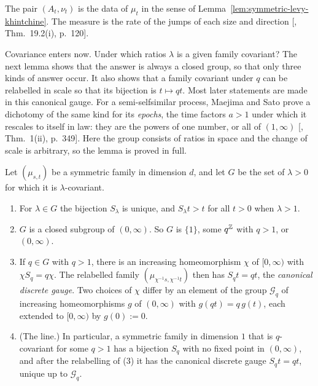 The pair $(A_t, \nu_t)$ is the \Levy{} data of $\mu_t$ in the sense of
Lemma~\ref{lem:symmetric-levy-khintchine}. The \Levy{} measure is the rate of the jumps of each size and
direction [, Thm.~19.2(i), p.~120].

Covariance enters now. Under which ratios $\lambda$ is a given family covariant? The next lemma
shows that the answer is always a closed group, so that only three kinds of answer occur. It also
shows that a family covariant under $q$ can be relabelled in scale so that its bijection is
$t \mapsto qt$. Most later statements are made in this canonical gauge. For a semi-selfsimilar
process, Maejima and Sato prove a dichotomy of the same kind for its \emph{epochs}, the time
factors $a > 1$ under which it rescales to itself in law: they are the powers of one number, or
all of $(1,\infty)$ [, Thm.~1(ii), p.~349]. Here the group consists of
ratios in space and the change of scale is arbitrary, so the lemma is proved in full.

\begin{lemma}
\label{lem:family-dilations}

Let $(\mu_{s,t})$ be a symmetric family in dimension $d$, and let $G$ be the set of $\lambda > 0$ for
which it is $\lambda$-covariant.
\begin{enumerate}
\item For $\lambda \in G$ the bijection $S_\lambda$ is unique, and $S_\lambda t > t$ for all $t > 0$
when $\lambda > 1$.
\item $G$ is a closed subgroup of $(0,\infty)$. So $G$ is $\{1\}$, some $q^{\mathbb{Z}}$ with $q > 1$, or
$(0,\infty)$.
\item If $q \in G$ with $q > 1$, there is an increasing homeomorphism $\chi$ of $[0,\infty)$ with
$\chi S_q = q\chi$. The relabelled family $(\mu_{\chi^{-1}s,\chi^{-1}t})$ then has $S_qt = qt$, the
\emph{canonical discrete gauge}. Two choices of $\chi$ differ by an element of the group
$\mathcal{G}_q$ of increasing homeomorphisms $g$ of $(0,\infty)$ with $g(qt) = q\,g(t)$, each
extended to $[0,\infty)$ by $g(0) := 0$.
\item (The line.) In particular, a symmetric family in dimension $1$ that is $q$-covariant for some
$q > 1$ has a bijection $S_q$ with no fixed point in $(0,\infty)$, and after the relabelling of (3)
it has the canonical discrete gauge $S_qt = qt$, unique up to $\mathcal{G}_q$.
\end{enumerate}
\end{lemma}

